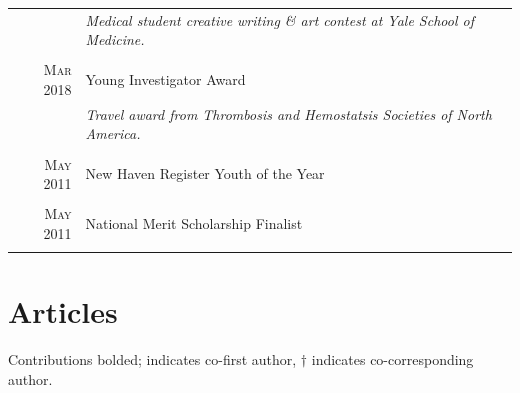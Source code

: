 \documentclass[a4paper,10pt]{article}
\begin{document}
\begin{tabular}{rp{11cm}}
 							    & \small\emph{Medical student creative writing \& art contest at Yale School of Medicine.} \\
 \multicolumn{2}{c}{} \\
 \textsc{Mar} 2018 & Young Investigator Award \\
 							    & \small\emph{Travel award from Thrombosis and Hemostatsis Societies of North America.} \\
 \multicolumn{2}{c}{} \\
 \textsc{May} 2011 & New Haven Register Youth of the Year \\
 \multicolumn{2}{c}{} \\
 \textsc{May} 2011 & National Merit Scholarship Finalist \\
 \multicolumn{2}{c}{} \\
\end{tabular}

\section{Articles}
Contributions bolded; {\bf *} indicates co-first author, {\bf $\dag$} indicates co-corresponding author. 
\end{document}
